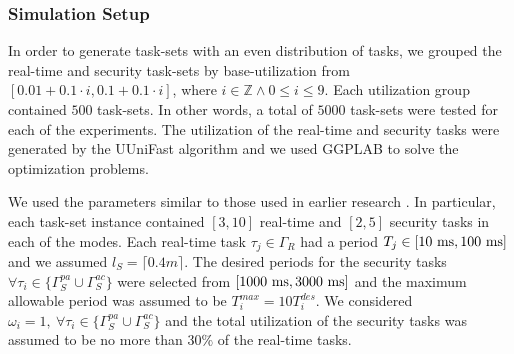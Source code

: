 
% 

\subsubsection{Simulation Setup}
\label{subsec:ex_setup}

In order to generate task-sets with an even distribution of tasks, we grouped the real-time and security task-sets by base-utilization from $[0.01+0.1 \cdot i, 0.1+0.1 \cdot i]$, where $i \in \mathbb{Z} \wedge 0 \leq i \leq 9$. Each utilization group contained $500$ task-sets. In other words, a total of $5000$ task-sets were tested for each of the experiments. The utilization of the real-time and security tasks were generated by the UUniFast \cite{uunifast} algorithm and we used GGPLAB \cite{ggplab} to solve the optimization problems.

We used the parameters similar to those used in earlier research \cite{sg1,mhasan_rtss16}. In particular, 
each task-set instance contained $[3, 10]$ real-time and $[2, 5]$  security tasks in each of the modes. Each real-time task $\tau_j \in \Gamma_R$ had a period $T_j \in [10~\rm{ms}, 100~\rm{ms}]$
and we assumed $l_S = \lceil 0.4 m \rceil$.  The desired periods for the security tasks $\forall \tau_i \in \lbrace \Gamma_S^{pa} \cup \Gamma_S^{ac} \rbrace$ were selected from $[1000~\rm{ms}, 3000~\rm{ms}]$ and the maximum allowable period was assumed to be $T_i^{max} = 10 T_i^{des}$.  We considered $\omega_i = 1, ~\forall \tau_i \in \lbrace \Gamma_S^{pa} \cup \Gamma_S^{ac} \rbrace$ and the total utilization of the security tasks was assumed to be no more than $30\%$ of the real-time tasks.  

% 
